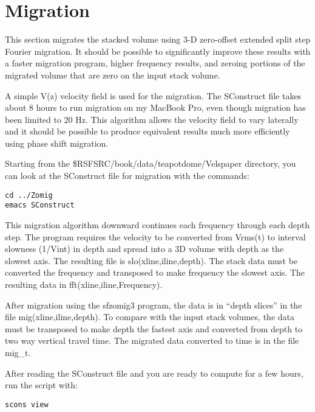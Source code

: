 

\section{Migration}

This section migrates the stacked volume using 3-D zero-offset extended split step Fourier migration.  It should be possible to significantly improve these results with a faster migration program, higher frequency results, and zeroing portions of the migrated volume that are zero on the input stack volume.

A simple V(z) velocity field is used for the migration.  The SConstruct file takes about 8 hours to run migration on my MacBook Pro, even though migration has been limited to 20 Hz.   This algorithm allows the velocity field to vary laterally and it should be possible to produce equivalent results much more efficiently using phase shift migration.
 
Starting from the \$RSFSRC/book/data/teapotdome/Velspaper directory, you can look at the SConstruct file for migration with the commands:
\begin{verbatim}  
cd ../Zomig
emacs SConstruct
\end{verbatim}  

This migration algorithm downward continues each frequency through each depth step.  The program requires the velocity to be converted from Vrms(t) to interval slowness (1/Vint) in depth and spread into a 3D volume with depth as the slowest axis.  The resulting file is slo(xline,iline,depth).  The stack data must be converted the frequency and transposed to make frequency the slowest axis.  The resulting data in fft(xline,iline,Frequency).  
 
After migration using the sfzomig3 program, the data is in “depth slices” in the file mig(xline,iline,depth).  To compare with the input stack volumes, the data must be transposed to make depth the fastest axis and converted from depth to two way vertical travel time.  The migrated data converted to time is in the file mig\_t.

After reading the SConstruct file and you are ready to compute for a few hours, run the script with:
\begin{verbatim}  
scons view
\end{verbatim}  

